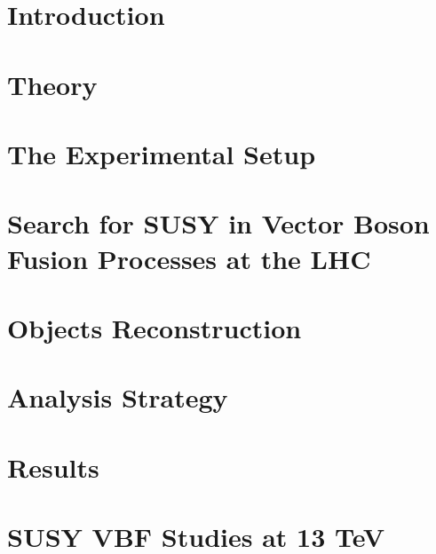 \documentclass[
twoside=false,
headsepline,     %
headings=normal,
open=any,
numbers=noenddot, %
numbering %
]{scrreprt} %
\begin{document}
\setcounter{page}{1}
\tableofcontents

\cleardoublepage

\setcounter{page}{1}


\chapter{Introduction}
\label{sec:introduction}

\cleardoublepage

\chapter{Theory}
\label{sec:theory}

\cleardoublepage

\chapter{The Experimental Setup}
\label{sec:detector}

\cleardoublepage

\chapter{Search for SUSY in Vector Boson Fusion Processes at the LHC}
\label{sec:VBFSUSY}

\cleardoublepage

\chapter{Objects Reconstruction}
\label{sec:VBFSUSY}

\cleardoublepage

\chapter{Analysis Strategy}
\label{sec:analysis}

\cleardoublepage

\chapter{Results}
\label{sec:results}

\cleardoublepage

\chapter{SUSY VBF Studies at 13 TeV}
\label{sec:13TeVanalysis}

\cleardoublepage
\end{document}
